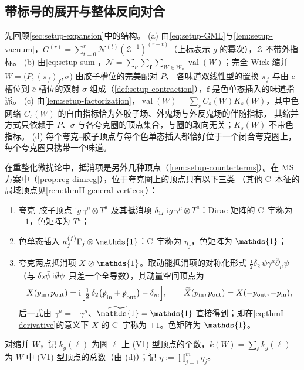 \documentclass[UTF8,a4paper,11pt,fontset=fandol]{ctexart}
\let\amsmathbb\mathbb
\renewcommand{\mathbb}[1]{\ifx1#1\mathds{1}\else\amsmathbb{#1}\fi}
\theoremstyle{cplain}
\theoremstyle{cdefinition}
\theoremstyle{cremark}
\numberwithin{equation}{section}
\newcommand{\sla}[1]{\slashed{#1}}                  %
\newcommand{\ii}{\mathrm{i}}                        %
\newcommand{\Cconj}[1]{\widetilde{#1}}              %
\begin{document}
\subsection{带标号的展开与整体反向对合}\label{sec:thmII-rho}

先回顾\cref{sec:setup-expansion}中的结构。
(a) 由\cref{eq:setup-GML}与\cref{lem:setup-vacuum}，$G^{(r)}=\sum_{t=0}^{r}\mathcal N^{(t)}(\mathcal Z^{-1})^{(r-t)}$（上标表示 $g$ 的幂次），$\mathcal Z$ 不带外指标。
(b) 由\cref{eq:setup-sum}，$\mathcal N=\sum_\nu\sum_{\boldsymbol f}\sum_{W\in\mathcal W_\nu}\operatorname{val}(W)$；完全 Wick 缩并 $W=\bigl(P,(\pi_f)_f,\sigma\bigr)$ 由胶子槽位的完美配对 $P$、
各味道双线性型的置换 $\pi_f$ 与由 $c$-槽位到 $\bar c$-槽位的双射 $\sigma$ 组成（\cref{def:setup-contraction}），$\boldsymbol f$ 是色单态插入的味道指派。
(c) 由\cref{lem:setup-factorization}，$\operatorname{val}(W)=\sum_sC_s(W)K_s(W)$，其中色网络 $C_s(W)$ 的自由指标恰为外胶子场、外鬼场与外反鬼场的伴随指标，
其缩并方式只依赖于 $P$、$\sigma$ 与各夸克圈的顶点集合，与圈的取向无关；$K_s(W)$ 不带色指标。
(d) 每个夸克--胶子顶点与每个色单态插入都恰好位于一个闭合夸克圈上，每个夸克圈只携带一个味道。

在重整化微扰论中，抵消项是另外几种顶点（\cref{rem:setup-counterterms}）。在 $\overline{\mathrm{MS}}$ 方案中（\cref{prop:reg-dimreg}），位于夸克圈上的顶点只有以下三类
（其他 C~本征的局域顶点见\cref{rem:thmII-general-vertices}）：
\begin{enumerate}[label=(V\arabic*),leftmargin=2.8em,itemsep=2pt,topsep=3pt]
\item 夸克--胶子顶点 $\ii g\,\gamma^\mu\otimes T^a$ 及其抵消项 $\delta_{1F}\,\ii g\,\gamma^\mu\otimes T^a$：Dirac 矩阵的 C~宇称为 $-1$，色矩阵为 $T^a$；
\item 色单态插入 $\kappa_j^{(f)}\Gamma_j\otimes\mathbb 1$：C~宇称为 $\eta_j$，色矩阵为 $\mathbb 1$；
\item 夸克两点抵消项 $X\otimes\mathbb 1$。取动能抵消项的对称化形式 $\frac{\ii}{2}\delta_2\,\bar\psi\gamma^\mu\overleftrightarrow{\partial_\mu}\psi$（与 $\delta_2\bar\psi\,\ii\sla\partial\psi$ 只差一个全导数），其动量空间顶点为
      \begin{equation}\label{eq:thmII-X}
      X(p_{\mathrm{in}},p_{\mathrm{out}})=\ii\Bigl[\tfrac12\,\delta_2\bigl(\sla p_{\mathrm{in}}+\sla p_{\mathrm{out}}\bigr)-\delta_m\Bigr],\qquad
      \Cconj{X}(p_{\mathrm{in}},p_{\mathrm{out}})=X(-p_{\mathrm{out}},-p_{\mathrm{in}}),
      \end{equation}
      后一式由 $\Cconj{\gamma^\mu}=-\gamma^\mu$、$\Cconj{\mathbb 1}=\mathbb 1$ 直接得到；即在\cref{eq:thmI-derivative}的意义下 $X$ 的 C~宇称为 $+1$。色矩阵为 $\mathbb 1$。
\end{enumerate}
对缩并 $W$，记 $k_g(\ell)$ 为圈 $\ell$ 上 (V1) 型顶点的个数，$k(W)=\sum_\ell k_g(\ell)$ 为 $W$ 中 (V1) 型顶点的总数（由 (d)）；记 $\eta:=\prod_{j=1}^m\eta_j$。
\end{document}
